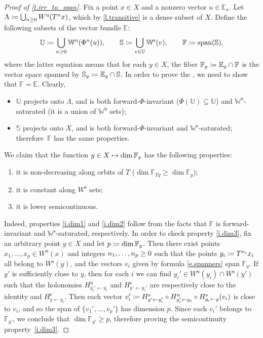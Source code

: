 \documentclass[JEP,XML,SOM,Unicode]{cedram}
\def\vcentcolon{\mathrel{\mathop\ordinarycolon}}
\providecommand\ordinarycolon{:}
\providecommand*\coloneqq{\vcentcolon\mathrel{\mkern-1.2mu}=}
\newcommand\mto{\mathchoice{\longmapsto}{\mapsto}{\mapsto}{\mapsto}}
\theoremstyle{plain}
\theoremstyle{definition}
\newcommand{\EE}{\mathbb{E}}
\newcommand{\FF}{\mathbb{F}}
\newcommand{\WW}{\mathbb{W}}
\newcommand{\uu}{\mathrm{u}}
\renewcommand{\ss}{\mathrm{s}}
\begin{document}
\begin{proof}[Proof of \cref{t.irr_to_span}]
Fix a point $x \in X$ and a nonzero vector $u \in \EE_x$.
Let $\Lambda \coloneqq \bigcup_{n \ge 0} W^\uu(T^n x)$, which by \cref{l.transitive} is a dense subset of $X$.
Define the following subsets of the vector bundle $\EE$:
\[
\mathbb{U} \coloneqq \bigcup_{n \ge 0} \WW^\uu(\Phi^n (u)),
\qquad
\mathbb{S} \coloneqq \bigcup_{v \in \mathbb{U}} \WW^\ss(v),
\qquad
\FF \coloneqq \mathrm{span}(\mathbb{S}),
\]
where the latter equation means that for each $y \in X$, the fiber $\FF_y \coloneqq \EE_y \cap \FF$ is the vector space spanned by $\mathbb{S}_y \coloneqq \EE_y \cap \mathbb{S}$.
In order to prove the , we need to show that $\FF = \EE$.
Clearly,
\begin{itemize}
\item $\mathbb{U}$ projects onto $\Lambda$, and is both forward-$\Phi$-invariant (\ie $\Phi(\mathbb{U}) \subseteq \mathbb{U}$) and $\WW^\uu$\nobreakdash-sat\-urated (\ie it is a union of $\WW^\uu$ sets);
\item $\mathbb{S}$ projects onto $X$, and is both forward-$\Phi$-invariant and $\WW^\ss$-saturated; therefore~$\FF$ has the same properties.
\end{itemize}

We claim that the function $y \in X \mto \dim \FF_y$ has the following properties:\enlargethispage{.5\baselineskip}%
\begin{enumerate}
\item\label{i.dim1}
it is non-decreasing along orbits of $T$ (\ie $\dim \FF_{Ty} \ge \dim \FF_y$);
\item\label{i.dim2}
it is constant along $W^\ss$ sets;
\item\label{i.dim3}
it is lower semicontinuous.
\end{enumerate}
Indeed, properties \eqref{i.dim1} and \eqref{i.dim2} follow from the facts that $\FF$ is forward-invariant and $\WW^\ss$-saturated, respectively.
In order to check property \eqref{i.dim3}, fix an arbitrary point \hbox{$y \in X$} and let $p \coloneqq \dim \FF_y$.
Then there exist points $x_1, \dots, x_p \in W^\uu(x)$ and integers $n_1, \dots, n_p \ge\nobreak 0$ such that the points $y_i \coloneqq T^{n_i} x_i$ all belong to $W^\ss(y)$, and the vectors $v_i$ given by formula \eqref{e.spanners} span $\FF_y$.
If $y'$ is sufficiently close to $y$, then for each $i$ we can find $y_i' \in W^\uu(y_i)\cap W^\ss(y')$ such that the holonomies $H^\uu_{y_i' \gets y_i}$ and $H^\ss_{y' \gets y_i'}$ are respectively close to the identity and $H^\ss_{y \gets y_i}$. Then each vector $v_i' \coloneqq H^\ss_{y' \gets y'_i} \circ H^\uu_{y'_i \gets y_i} \circ H^\ss_{y_i \gets y} (v_i)$ is close to $v_i$, and so the span of $\{v_1', \dots, v_p'\}$ has dimension $p$. Since each $v_i'$ belongs to~$\FF_{y'}$, we conclude that $\dim \FF_{y'} \ge p$, therefore proving the semicontinuity property~\eqref{i.dim3}.


\end{proof}
\end{document}
